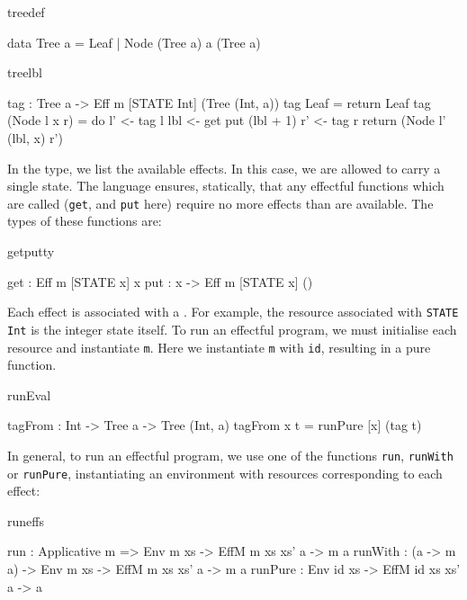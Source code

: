 \begin{SaveVerbatim}{treedef}

data Tree a = Leaf 
            | Node (Tree a) a (Tree a)

\end{SaveVerbatim}

\begin{SaveVerbatim}{treelbl}

tag : Tree a -> Eff m [STATE Int] (Tree (Int, a))
tag Leaf = return Leaf
tag (Node l x r) 
     = do l' <- tag l
          lbl <- get
          put (lbl + 1)
          r' <- tag r
          return (Node l' (lbl, x) r')

\end{SaveVerbatim}

\noindent
In the type, we list the available effects. In this case, we are allowed
to carry a single state. The \Eff{}
language ensures, statically, that any effectful functions which are called
(\texttt{get}, and \texttt{put} here) require no more effects
than are available. The types of these functions are:

\begin{SaveVerbatim}{getputty}

get : Eff m [STATE x] x
put : x -> Eff m [STATE x] ()

\end{SaveVerbatim}

Each effect is associated with a . For example, the resource
associated with \texttt{STATE Int} is the integer state itself.
To run an effectful program, we must initialise each resource and instantiate
\texttt{m}. Here we instantiate \texttt{m} with \texttt{id}, resulting in
a pure function.

\begin{SaveVerbatim}{runEval}

tagFrom : Int -> Tree a -> Tree (Int, a)
tagFrom x t = runPure [x] (tag t)

\end{SaveVerbatim}

\noindent
In general, to run an effectful program, we use one of the functions
\texttt{run}, \texttt{runWith} or \texttt{runPure}, instantiating an
environment with resources corresponding to each effect:

\begin{SaveVerbatim}{runeffs}

run     : Applicative m => 
          Env m xs -> EffM m xs xs' a -> m a
runWith : (a -> m a) -> 
          Env m xs -> EffM m xs xs' a -> m a
runPure : Env id xs -> EffM id xs xs' a -> a

\end{SaveVerbatim}


